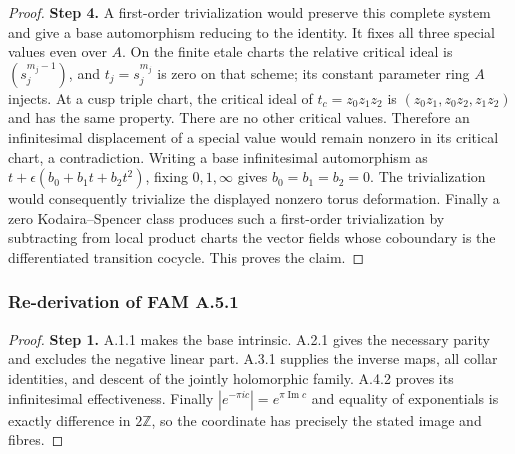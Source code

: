 \begin{proof}
\par\smallskip\noindent\textbf{Step 4.} A first-order trivialization would preserve this complete system and give a base automorphism reducing to the identity. It fixes all three special values even over $A$. On the finite etale charts the relative critical ideal is $(s_j^{m_j-1})$, and $t_j=s_j^{m_j}$ is zero on that scheme; its constant parameter ring $A$ injects. At a cusp triple chart, the critical ideal of $t_c=z_0z_1z_2$ is $(z_0z_1,z_0z_2,z_1z_2)$ and has the same property. There are no other critical values. Therefore an infinitesimal displacement of a special value would remain nonzero in its critical chart, a contradiction. Writing a base infinitesimal automorphism as $t+\epsilon(b_0+b_1t+b_2t^2)$, fixing $0,1,\infty$ gives $b_0=b_1=b_2=0$. The trivialization would consequently trivialize the displayed nonzero torus deformation. Finally a zero Kodaira--Spencer class produces such a first-order trivialization by subtracting from local product charts the vector fields whose coboundary is the differentiated transition cocycle. This proves the claim.
\end{proof}
\subsubsection{Re-derivation of FAM A.5.1}
\begin{proof}
\par\smallskip\noindent\textbf{Step 1.} A.1.1 makes the base intrinsic. A.2.1 gives the necessary parity and excludes the negative linear part. A.3.1 supplies the inverse maps, all collar identities, and descent of the jointly holomorphic family. A.4.2 proves its infinitesimal effectiveness. Finally $|e^{-\pi ic}|=e^{\pi\operatorname{Im}c}$ and equality of exponentials is exactly difference in $2\mathbb Z$, so the coordinate has precisely the stated image and fibres.
\end{proof}
